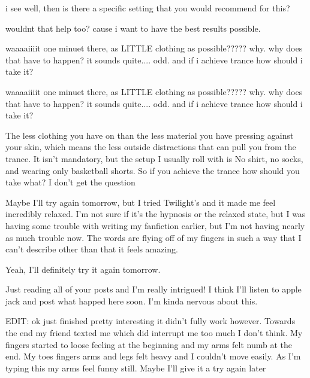 \documentclass[ebook,12pt,oneside,openany]{memoir}
\newcommand{\mytexttilde}{\raisebox{0.5ex}{\texttildelow}}
\begin{document}
\begin{tcolorbox}[title=Toby]
\begin{tcolorbox}[title=Toby]
\par{i see well, then is there a specific setting that you would recommend for this?}
\par{  wouldnt that help too? cause i want to have the best results possible. }
\end{tcolorbox}
\par{waaaaiiiit one minuet there, as LITTLE clothing as possible????? why. why does that have to happen? it sounds quite.... odd. and if i achieve trance how should i take it?  }
\end{tcolorbox}
\begin{tcolorbox}[title=\mytexttilde{}Lawful Sturdy Wing\mytexttilde{},colback=magenta!5!white,colframe=magenta!75!black,coltitle=white]
\begin{tcolorbox}[title=Toby]
\par{waaaaiiiit one minuet there, as LITTLE clothing as possible????? why. why does that have to happen? it sounds quite.... odd. and if i achieve trance how should i take it?  }
\end{tcolorbox}
\par{The less clothing you have on than the less material you have pressing against your skin, which means the less outside distractions that can pull you from the trance. It isn't mandatory, but the setup I usually roll with is No shirt, no socks, and wearing only basketball shorts. So if you achieve the trance how should you take what? I don't get the question}
\end{tcolorbox}
\begin{tcolorbox}[title=Prof. Yana]
\par{Maybe I'll try again tomorrow, but I tried Twilight's and it made me feel incredibly relaxed. I'm not sure if it's the hypnosis or the relaxed state, but I was having some trouble with writing my fanfiction earlier, but I'm not having nearly as much trouble now. The words are flying off of my fingers in such a way that I can't describe other than that it feels amazing.}
\newline{}
\par{Yeah, I'll definitely try it again tomorrow.}
\end{tcolorbox}
\begin{tcolorbox}[title=ZenPowerBuilder]
\par{Just reading all of your posts and I'm really intrigued! I think I'll listen to apple jack and post what happed here soon.  I'm kinda nervous about this.}
\newline{}
\par{EDIT: ok just finished pretty interesting it didn't fully work however.  Towards the end my friend texted me which did interrupt me too much I don't think.  My fingers started to loose feeling at the beginning and my arms felt numb at the end.  My toes fingers arms and legs felt heavy and I couldn't move easily.  As I'm typing this my arms feel funny still.  Maybe I'll give it a try again later}
\end{tcolorbox}
\end{document}

